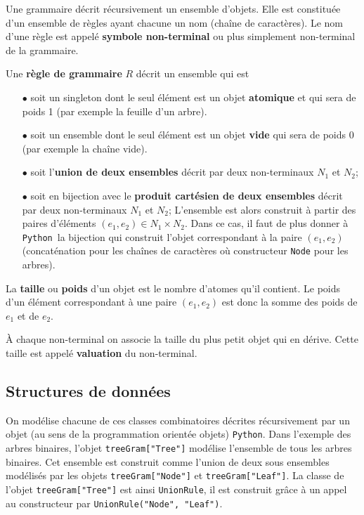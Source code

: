\documentclass[11pt]{article}
\renewcommand{\emph}[1]{\textbf{#1}}
\newcommand{\Python}{\texttt{Python}}
\begin{document}
Une grammaire décrit récursivement un ensemble d'objets. Elle est constituée
d'un ensemble de règles ayant chacune un nom (chaîne de caractères). Le nom
d'une règle est appelé \emph{symbole non-terminal} ou plus simplement
non-terminal de la grammaire.  \medskip

Une \emph{règle de grammaire} $R$ décrit un ensemble qui est
\begin{itemize}
\item[$\bullet$] soit un singleton dont le seul élément est un objet
  \emph{atomique} et qui sera de poids 1 (par exemple la feuille d'un arbre).
\item[$\bullet$] soit un ensemble dont le seul élément est un objet
  \emph{vide} qui sera de poids 0 (par exemple la chaîne vide).
\item[$\bullet$] soit l'\emph{union de deux ensembles} décrit par deux
  non-terminaux $N_1$ et $N_2$;
\item[$\bullet$] soit en bijection avec le \emph{produit cartésien de deux
    ensembles} décrit par deux non-terminaux $N_1$ et $N_2$; L'ensemble est
  alors construit à partir des paires d'éléments $(e_1, e_2) \in N_1 \times
  N_2$. Dans ce cas, il faut de plus donner à \Python\ la bijection qui
  construit l'objet correspondant à la paire $(e_1, e_2)$ (concaténation pour
  les chaînes de caractères où constructeur \texttt{Node} pour les arbres).
\end{itemize}
\medskip

La \emph{taille} ou \emph{poids} d'un objet est le nombre d'atomes qu'il
contient. Le poids d'un élément correspondant à une paire $(e_1, e_2)$ est
donc la somme des poids de $e_1$ et de $e_2$.

À chaque non-terminal on associe la taille du plus petit objet qui en dérive.
Cette taille est appelé \emph{valuation} du non-terminal.


\subsection{Structures de données}

On modélise chacune de ces classes combinatoires décrites récursivement par un
objet (au sens de la programmation orientée objets) \Python. Dans l'exemple
des arbres binaires, l'objet \verb+treeGram["Tree"]+ modélise l'ensemble de
tous les arbres binaires. Cet ensemble est construit comme l'union de deux
sous ensembles modélisés par les objets \verb+treeGram["Node"]+ et
\verb+treeGram["Leaf"]+.  La classe de l'objet \verb+treeGram["Tree"]+ est
ainsi \verb+UnionRule+, il est construit grâce à un appel au constructeur par
\verb+UnionRule("Node", "Leaf")+.
\end{document}
